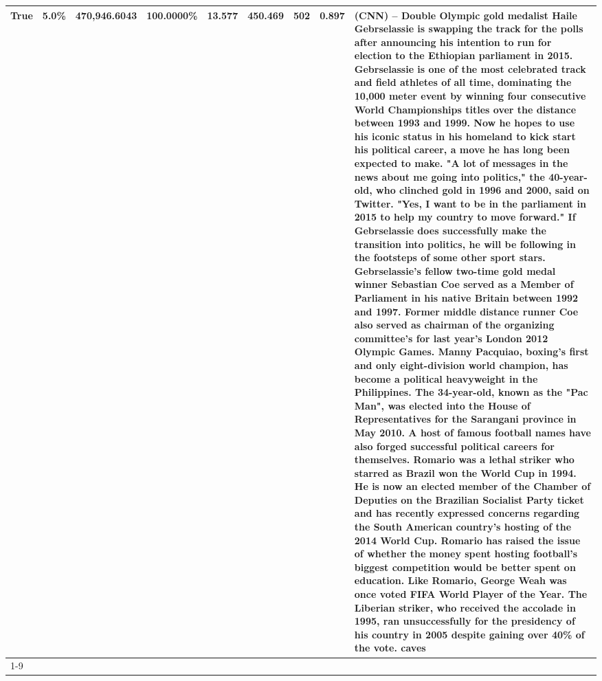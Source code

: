 \begin{table}[H]
{\begin{tabular}{lllrlllll}
True & 5.0\% & 470,946.6043 & \bfseries \color{red} 100.0000\% & 13.577 & 450.469 & 502 & 0.897 & (CNN) -- Double Olympic gold medalist Haile Gebrselassie is swapping the track for the polls after announcing his intention to run for election to the Ethiopian parliament in 2015. Gebrselassie is one of the most celebrated track and field athletes of all time, dominating the 10,000 meter event by winning four consecutive World Championships titles over the distance between 1993 and 1999. Now he hopes to use his iconic status in his homeland to kick start his political career, a move he has long been expected to make. "A lot of messages in the news about me going into politics," the 40-year-old, who clinched gold in 1996 and 2000, said on Twitter. "Yes, I want to be in the parliament in 2015 to help my country to move forward." If Gebrselassie does successfully make the transition into politics, he will be following in the footsteps of some other sport stars. Gebrselassie's fellow two-time gold medal winner Sebastian Coe served as a Member of Parliament in his native Britain between 1992 and 1997. Former middle distance runner Coe also served as chairman of the organizing committee's for last year's London 2012 Olympic Games. Manny Pacquiao, boxing's first and only eight-division world champion, has become a political heavyweight in the Philippines. The 34-year-old, known as the "Pac Man", was elected into the House of Representatives for the Sarangani province in May 2010. A host of famous football names have also forged successful political careers for themselves. Romario was a lethal striker who starred as Brazil won the World Cup in 1994. He is now an elected member of the Chamber of Deputies on the Brazilian Socialist Party ticket and has recently expressed concerns regarding the South American country's hosting of the 2014 World Cup. Romario has raised the issue of whether the money spent hosting football's biggest competition would be better spent on education. Like Romario, George Weah was once voted FIFA World Player of the Year. The Liberian striker, who received the accolade in 1995, ran unsuccessfully for the presidency of his country in 2005 despite gaining over 40\% of the vote. caves \\
\cline{1-9}

\end{tabular}}
\end{table}
